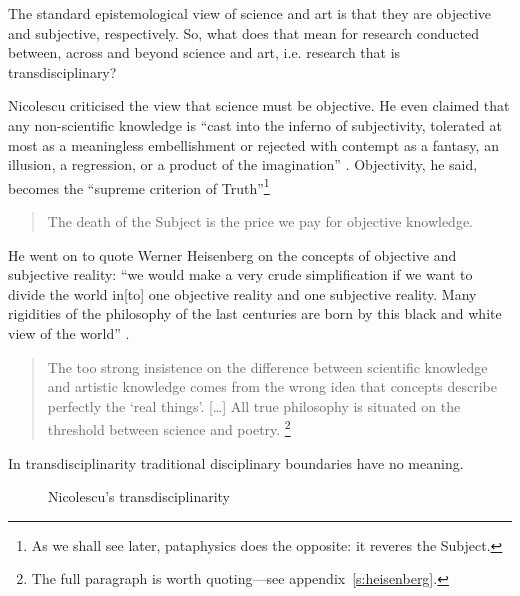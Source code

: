 The standard epistemological view of science and art is that they are objective and subjective, respectively. So, what does that mean for research conducted between, across and beyond science and art, i.e. research that is transdisciplinary?

Nicolescu criticised the view that science must be objective. He even claimed that any non-scientific knowledge is ``cast into the inferno of subjectivity, tolerated at most as a meaningless embellishment or rejected with contempt as a fantasy, an illusion, a regression, or a product of the imagination'' \autocite*{Nicolescu2010}. Objectivity, he said, becomes the ``supreme criterion of Truth''\footnote{As we shall see later, pataphysics does the opposite: it reveres the Subject.}

\begin{quotation}
  The death of the Subject is the price we pay for objective knowledge. 
\end{quotation}

He went on to quote Werner Heisenberg on the concepts of objective and subjective reality: ``we would make a very crude simplification if we want to divide the world in[to] one objective reality and one subjective reality. Many rigidities of the philosophy of the last centuries are born by this black and white view of the world'' \autocite[Heisenberg, cited in][]{Nicolescu2010}.

\begin{quotation}
  The too strong insistence on the difference between scientific knowledge and artistic knowledge comes from the wrong idea that concepts describe perfectly the `real things'. [\ldots] All true philosophy is situated on the threshold between science and poetry.  \footnote{The full paragraph is worth quoting---see appendix~\ref{s:heisenberg}.}
\end{quotation}

In transdisciplinarity traditional disciplinary boundaries have no meaning.

\begin{figure}[!htbp]
\centering
  \caption[Nicolescu's transdisciplinarity]{Nicolescu's transdisciplinarity}
\label{fig:trans}
\end{figure}


